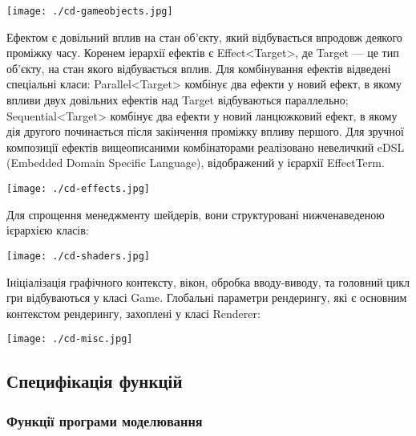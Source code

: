 \begin{center}
  \texttt{[image: ./cd-gameobjects.jpg]}
\end{center}

Ефектом є довільний вплив на стан об'єкту, який відбувається впродовж деякого проміжку часу. Коренем іерархії ефектів є Effect<Target>, де Target — це тип об'єкту, на стан якого відбувається вплив.
Для комбінування ефектів відведені спеціальні класи:
Parallel<Target> комбінує два ефекти у новий ефект, в якому впливи двух довільних ефектів над Target відбуваються параллельно;
Sequential<Target> комбінує два ефекти у новий ланцюжковий ефект, в якому дія другого починається після закінчення проміжку впливу першого.
	Для зручної композиції ефектів вищеописаними комбінаторами реалізовано невеличкий eDSL (Embedded Domain Specific Language), відображений у ієрархії EffectTerm.

\begin{center}
  \texttt{[image: ./cd-effects.jpg]}
\end{center}

Для спрощення менеджменту шейдерів, вони структуровані нижченаведеною ієрархією класів:

\begin{center}
  \texttt{[image: ./cd-shaders.jpg]}
\end{center}

Ініціалізація графічного контексту, вікон, обробка вводу-виводу, та головний цикл гри відбуваються у класі Game. Глобальні параметри рендерингу, які є основним контекстом рендерингу, захоплені у класі Renderer:

\begin{center}
  \texttt{[image: ./cd-misc.jpg]}
\end{center}

\subsection{Специфікація функцій}

\subsubsection{Функції програми моделювання}

